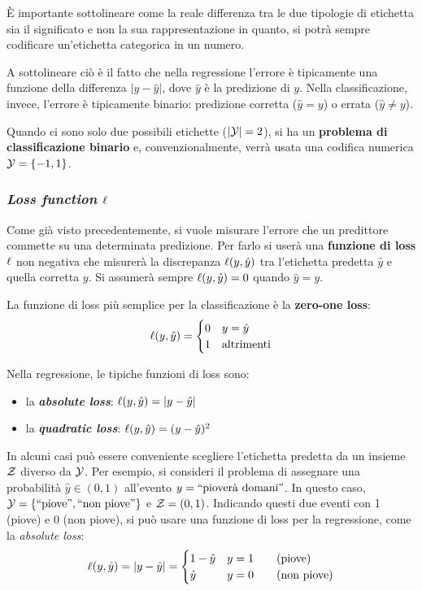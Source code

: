 È importante sottolineare come la reale differenza tra le due tipologie di etichetta sia il
significato e non la sua rappresentazione in quanto, si potrà sempre codificare
un'etichetta categorica in un numero.

A sottolineare ciò è il fatto che nella regressione l'errore è tipicamente una funzione della
differenza $| y-\hat{y} |$, dove $\hat{y}$ è la predizione di $y$. Nella classificazione, invece,
l'errore è tipicamente binario: predizione corretta ($\hat{y}=y$) o errata ($\hat{y}\neq y$).

Quando ci sono solo due possibili etichette ($|\mathcal{Y}|=2$), si ha un \textbf{problema di 
classificazione binario} e, convenzionalmente, verrà usata una codifica numerica 
$\mathcal{Y}=\{-1,1\}$.

\subsubsection{\textit{Loss function} \texorpdfstring{$\ell$}{l}}
Come già visto precedentemente, si vuole misurare l'errore che un predittore commette su una
determinata predizione. Per farlo si userà una \textbf{funzione di loss} $\ell$ non negativa 
che misurerà la discrepanza $\ell(y,\hat{y})$ tra l'etichetta predetta $\hat{y}$ e quella
corretta $y$. Si assumerà sempre $\ell(y,\hat{y})=0$ quando $\hat{y}=y$.

La funzione di loss più semplice per la classificazione è la \textbf{zero-one loss}:
$$ \ell(y,\hat{y}) = \begin{cases} 0 & y=\hat{y} \\ 1 & \text{altrimenti} \end{cases} $$

Nella regressione, le tipiche funzioni di loss sono:
\begin{itemize}
    \item la \textit{\textbf{absolute loss}}: $\ell(y,\hat{y}) = |y-\hat{y}|$
    \item la \textit{\textbf{quadratic loss}}: $\ell(y,\hat{y}) = (y-\hat{y})^2$
\end{itemize}

In alcuni casi può essere conveniente scegliere l'etichetta predetta da un insieme $\mathcal{Z}$ diverso 
da $\mathcal{Y}$. Per esempio, si consideri il problema di assegnare una probabilità $\hat{y}\in (0,1)$
all'evento $y=\text{``pioverà domani''}$. In questo caso, $\mathcal{Y}=\{\text{``piove''},
\text{``non piove''}\}$ e $\mathcal{Z} = (0,1)$. Indicando questi due eventi con 1 (piove) e 0 
(non piove), si può usare una funzione di loss per la regressione, come la 
\textit{absolute loss}:
$$ \ell(y,\hat{y}) = |y-\hat{y}| =  \begin{cases} 1-\hat{y} & y=1 \qquad (\text{piove}) \\
\hat{y} & y=0 \qquad (\text{non piove}) \end{cases} $$

